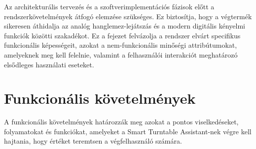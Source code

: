\documentclass[12pt,a4paper,hungarian]{report}
\begin{document}
Az architekturális tervezés és a szoftverimplementációs fázisok előtt a rendszerkövetelmények átfogó elemzése szükséges. Ez biztosítja, hogy a végtermék sikeresen áthidalja az analóg hanglemez-lejátszás és a modern digitális kényelmi funkciók közötti szakadékot. Ez a fejezet felvázolja a rendszer elvárt specifikus funkcionális képességeit, azokat a nem-funkcionális minőségi attribútumokat, amelyeknek meg kell felelnie, valamint a felhasználói interakciót meghatározó elsődleges használati eseteket.

\section{Funkcionális követelmények}

A funkcionális követelmények határozzák meg azokat a pontos viselkedéseket, folyamatokat és funkciókat, amelyeket a Smart Turntable Assistant-nek végre kell hajtania, hogy értéket teremtsen a végfelhasználó számára.
\end{document}
